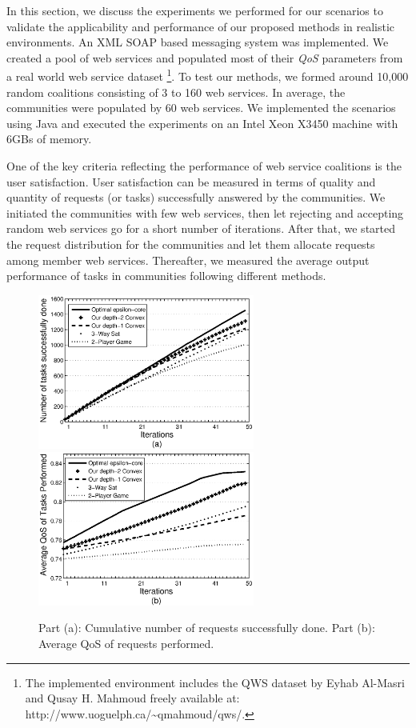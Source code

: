 In this section, we discuss the experiments we performed for our
scenarios to validate the applicability and performance of our
proposed methods in realistic environments.
An XML SOAP based messaging system was implemented. We created a pool of web services and populated most of
their \emph{QoS} parameters from a real world web service dataset
\cite{DBLP:conf/smc/Al-MasriM09a}\footnote[1]{The implemented
environment includes the QWS dataset by Eyhab Al-Masri and Qusay
H. Mahmoud freely available at:
http://www.uoguelph.ca/\textasciitilde{}qmahmoud/qws/.}. To test
our methods, we formed around 10,000 random coalitions consisting
of 3 to 160 web services. In average, the communities were populated by 60 web
services. We implemented the
scenarios using Java and executed the experiments on an Intel Xeon
X3450 machine with 6GBs of memory.

One of the key criteria reflecting the performance of web service
coalitions is the user satisfaction. User satisfaction can be
measured in terms of quality and quantity of requests (or tasks)
successfully answered by the communities. We initiated the
communities with few web services, then let rejecting and
accepting random web services go for a short number of iterations.
After that, we started the request distribution for the communities
and let them allocate requests among member web services.
Thereafter, we measured the average output performance of tasks in
communities following different methods.

\begin{figure}[!t]
\centering
\includegraphics[width=2.8in]{Figures/task_done_opt.eps}
\includegraphics[width=2.8in]{Figures/task_qos_opt.eps}
\caption{Part (a): Cumulative number of requests successfully
done. Part (b): Average QoS of requests performed.}
\label{performanceall}
\end{figure}

